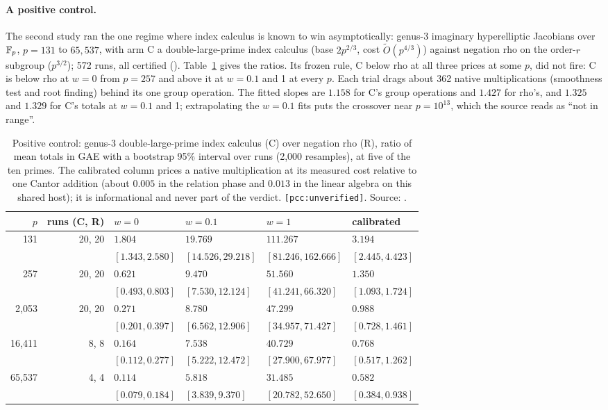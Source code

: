 \paragraph{A positive control.} The second study ran the one regime where
index calculus is known to win asymptotically: genus-3 imaginary
hyperelliptic Jacobians over $\mathbb{F}_p$, $p=131$ to $65{,}537$, with arm C a
double-large-prime index calculus (base $2p^{2/3}$, cost $\tilde O(p^{4/3})$)
against negation rho on the order-$r$ subgroup ($p^{3/2}$); 572 runs, all
certified ().
Table~\ref{tab:em-posctl} gives the ratios. Its frozen rule, C below rho at
all three prices at some $p$, did not fire: C is below rho at $w=0$ from
$p=257$ and above it at $w=0.1$ and 1 at every $p$. Each trial drags about
362 native multiplications (smoothness test and root finding) behind its
one group operation. The fitted slopes are $1.158$ for C's group operations
and $1.427$ for rho's, and $1.325$ and $1.329$ for C's totals at $w=0.1$
and 1; extrapolating the $w=0.1$ fits puts the crossover near $p=10^{13}$,
which the source reads as ``not in range''.

\begin{table}[t]
\centering\small
\begin{tabular}{@{}rrllll@{}}
\toprule
$p$ & runs (C, R) & $w=0$ & $w=0.1$ & $w=1$ & calibrated \\
\midrule
131 & 20, 20 & $1.804$ & $19.769$ & $111.267$ & $3.194$ \\
 & & $[1.343,2.580]$ & $[14.526,29.218]$ & $[81.246,162.666]$ & $[2.445,4.423]$ \\
257 & 20, 20 & $0.621$ & $9.470$ & $51.560$ & $1.350$ \\
 & & $[0.493,0.803]$ & $[7.530,12.124]$ & $[41.241,66.320]$ & $[1.093,1.724]$ \\
2{,}053 & 20, 20 & $0.271$ & $8.780$ & $47.299$ & $0.988$ \\
 & & $[0.201,0.397]$ & $[6.562,12.906]$ & $[34.957,71.427]$ & $[0.728,1.461]$ \\
16{,}411 & 8, 8 & $0.164$ & $7.538$ & $40.729$ & $0.768$ \\
 & & $[0.112,0.277]$ & $[5.222,12.472]$ & $[27.900,67.977]$ & $[0.517,1.262]$ \\
65{,}537 & 4, 4 & $0.114$ & $5.818$ & $31.485$ & $0.582$ \\
 & & $[0.079,0.184]$ & $[3.839,9.370]$ & $[20.782,52.650]$ & $[0.384,0.938]$ \\
\bottomrule
\end{tabular}
\caption[]{Positive control: genus-3 double-large-prime index calculus (C)
over negation rho (R), ratio of mean totals in GAE with a bootstrap 95\%
interval over runs (2{,}000 resamples), at five of the ten primes. The
calibrated column prices a native multiplication at its measured cost
relative to one Cantor addition (about $0.005$ in the relation phase and
$0.013$ in the linear algebra on this shared host); it is informational and
never part of the verdict. \texttt{[pcc:unverified]}. Source:
.}
\label{tab:em-posctl}
\end{table}

